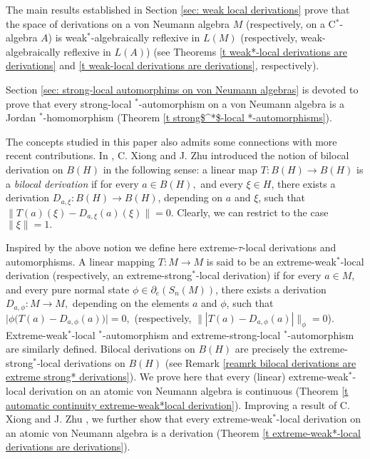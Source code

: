 \documentclass[11pt]{amsart}
\begin{document}
The main results established in Section \ref{sec: weak local derivations} prove that the space of derivations on a von Neumann algebra $M$ (respectively, on a C$^*$-algebra $A$) is weak$^*$-algebraically reflexive in $L(M)$ (respectively, weak-algebraically reflexive in $L(A)$) (see Theorems \ref{t weak*-local derivations are derivations} and \ref{t weak-local derivations are derivations}, respectively).\smallskip

Section \ref{sec: strong-local automorphims on von Neumann algebras} is devoted to prove that every strong-local $^*$-automorphism on a von Neumann algebra is a Jordan $^*$-homomorphism (Theorem \ref{t strong$^*$-local *-automorphisms}).\smallskip

The concepts studied in this paper also admits some connections with more recent contributions. In \cite{ZhuXiong97},  C. Xiong and J. Zhu introduced the notion of bilocal derivation on $B(H)$ in the following sense: a linear map $T: B(H)\to B(H)$ is a \emph{bilocal derivation} if for every $a\in B(H),$ and every $\xi\in H$, there exists a derivation $D_{a,\xi} : B(H)\to B(H)$, depending on $a$ and $\xi$, such that $\|T(a) (\xi) - D_{a,\xi} (a) (\xi)\|=0.$ Clearly, we can restrict to the case $\|\xi\|=1.$

Inspired by the above notion we define here extreme-$\tau$-local derivations and automorphisms. A linear mapping $T: M \to M$ is said to be an extreme-weak$^*$-local derivation {\rm(}respectively, an extreme-strong$^*$-local derivation{\rm)} if for every $a\in M$, and every pure normal state $\phi\in \partial_{e} (S_n(M))$, there exists a derivation $D_{a,\phi}: M\to M,$ depending on the elements $a$ and $\phi$, such that $\Big|\phi \Big(T(a) - D_{a,\phi} (a)\Big)\Big|=0,$ {\rm(}respectively, $\||T(a) - D_{a,\phi} (a)|\|_{\phi }=0${\rm)}. Extreme-weak$^*$-local $^*$-automorphism and extreme-strong-local $^*$-automorphism are similarly defined. Bilocal derivations on $B(H)$ are precisely the extreme-strong$^*$-local derivations on $B(H)$ (see Remark \ref{reamrk bilocal derivations are extreme strong* derivations}). We prove here that every (linear) extreme-weak$^*$-local derivation on an atomic von Neumann algebra is continuous (Theorem \ref{t automatic continuity extreme-weak*local derivation}). Improving a result of C. Xiong and J. Zhu \cite[Theorem 3]{ZhuXiong97}, we further show that every extreme-weak$^*$-local derivation on an atomic von Neumann algebra is a derivation (Theorem \ref {t extreme-weak*-local derivations are derivations}).\smallskip
\end{document}
